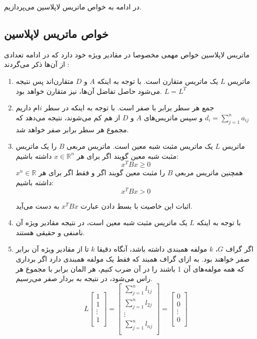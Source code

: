 در ادامه به خواص ماتریس لاپلاسین می‌پردازیم.

\subsection{خواص ماتریس لاپلاسین}\label{sec laplacian properties}
ماتریس لاپلاسین خواص مهمی مخصوصا در مقادیر ویژه خود دارد که در ادامه تعدادی از آن‌ها ذکر می‌گردند \cite{strang1988linear}:
\begin{enumerate}
	\item 
	ماتریس $L$ یک ماتریس متقارن است. با توجه به اینکه $A$ و $D$ متقارن‌اند پس نتیجه می‌شود حاصل تفاضل آن‌ها، نیز متقارن خواهد بود. $L = L^T$
	\item 
	جمع هر سطر برابر با صفر است. با توجه به اینکه در سطر $i$ام داریم 
$d_i = \sum_{j=1}^{n} a_{ij}$
و سپس ماتریس‌های $A$ و $D$ از هم کم می‌شوند، نتیجه می‌دهد که مجموع هر سطر برابر صفر خواهد شد.
	\item 
	ماتریس $L$ یک ماتریس مثبت شبه معین است. ماتریس مربعی $B$ را یک ماتریس مثبت شبه معین گویند اگر برای هر $x \in \mathbb{R}^n$ داشته باشیم:
	\begin{equation}
		x^TBx \ge 0
	\end{equation}
همچنین ماتریس مربعی $B$ را مثبت معین گویند اگر و فقط اگر برای هر $x ^n\in \mathbb{R}$ داشته باشیم:
\begin{equation}
	x^TBx > 0
\end{equation}

اثبات این خاصیت با بسط دادن عبارت $x^TBx$ به دست می‌آید.

	\item 
	با توجه به اینکه $L$ یک ماتریس مثبت شبه معین است، در نتیجه مقادیر ویژه آن نامنفی و حقیقی هستند.
	
	\item
	اگر گراف $G$، $k$ مولفه همبندی داشته باشد، آنگاه دقیقا $k$ تا از مقادیر ویژه آن برابر صفر خواهند بود. به ازای گراف همبند که فقط یک مولفه همبندی دارد اگر برداری که همه مولفه‌های آن 1 باشند را در آن ضرب کنیم، هر المان برابر با مجموع هر راس می‌شود، در نتیجه به بردار صفر می‌رسیم.
\begin{equation}\label{eq L1 = 0}
	L
	\begin{bmatrix}
	1 \\
	1 \\
	\vdots \\
	1 \\
	\end{bmatrix}
	= 
	\begin{bmatrix}
	\sum_{j=1}^{n} l_{1j} \\
	\sum_{j=1}^{n} l_{2j} \\
	\vdots \\
	\sum_{j=1}^{n} l_{nj} \\
	\end{bmatrix}
	= 
	\begin{bmatrix}
	0 \\
	0 \\
	\vdots \\
	0 \\
	\end{bmatrix}
\end{equation}


\end{enumerate}

